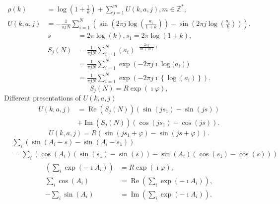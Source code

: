 \documentclass[titlepage,fleqn]{article}%
\providecommand{\U}[1]{\protect\rule{.1in}{.1in}}
\begin{document}
\begin{align*}
\rho(k)  &  =\log\left(  1+\frac{1}{k}\right)  +%
{\displaystyle\sum\limits_{j=1}^{m}}
U(k,a,j),m\in%
\mathbb{Z}
^{\ast},\\
U(k,a,j)  &  =-\frac{1}{\pi jN}%
{\displaystyle\sum\limits_{i=1}^{N}}
\left(  \sin\left(  2\pi j\log\left(  \frac{a_{i}}{1+k}\right)  \right)
-\sin\left(  2\pi j\log\left(  \frac{a_{i}}{k}\right)  \right)  \right)  .
\end{align*}%
\begin{align*}
s  &  =2\pi\log(k),s_{1}=2\pi\log(1+k),\\
S_{j}(N)  &  =\frac{1}{\pi jN}%
{\displaystyle\sum\limits_{i=1}^{N}}
\left(  a_{i}\right)  ^{-\frac{2\pi j}{\ln(10)}\imath}\\
&  =\frac{1}{\pi jN}%
{\displaystyle\sum\limits_{i=1}^{N}}
\exp\left(  -2\pi j\imath\log(a_{i}\right)  )\\
&  =\frac{1}{\pi jN}%
{\displaystyle\sum\limits_{i=1}^{N}}
\exp\left(  -2\pi j\imath\left\{  \log\left(  a_{i}\right)  \right\}  \right)
.
\end{align*}%
\[
S_{j}(N)=R\exp(\imath\varphi),
\]
Different presentations of $U(k,a,j)$
\begin{align*}
U(k,a,j)  &  =\operatorname{Re}(S_{j}(N))\left(  \sin(js_{1})-\sin(js)\right)
\\
&  +\operatorname{Im}(S_{j}(N))\left(  \cos(js_{1})-\cos(js)\right)  .
\end{align*}%
\[
U(k,a,j)=R\left(  \sin(js_{1}+\varphi)-\sin(js+\varphi)\right)  .
\]%
\begin{align*}
&
{\displaystyle\sum\limits_{i}}
\left(  \sin(A_{i}-s)-\sin(A_{i}-s_{1})\right) \\
&  =%
{\displaystyle\sum\limits_{i}}
\left(  \cos(A_{i})(\sin(s_{1})-\sin(s))-\sin(A_{i})(\cos(s_{1})-\cos
(s))\right)
\end{align*}%
\begin{align*}
\left(
{\displaystyle\sum\limits_{i}}
\exp(-\imath A_{i})\right)   &  =R\exp(\imath\varphi),\\%
{\displaystyle\sum\limits_{i}}
\cos(A_{i})  &  =\operatorname{Re}\left(
{\displaystyle\sum\limits_{i}}
\exp(-\imath A_{i})\right)  ,\\
-%
{\displaystyle\sum\limits_{i}}
\sin(A_{i})  &  =\operatorname{Im}\left(
{\displaystyle\sum\limits_{i}}
\exp(-\imath A_{i})\right)  .
\end{align*}
%
\end{document}
